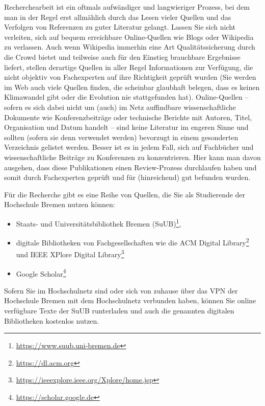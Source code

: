 \documentclass[11pt]{scrartcl}
\newcommand{\qto}[1]{\glqq #1\grqq}				%
\begin{document}
Recherchearbeit ist ein oftmals aufwändiger und langwieriger Prozess, bei dem man in der Regel erst allmählich durch das Lesen vieler Quellen und das Verfolgen von Referenzen zu \qto{guter} Literatur gelangt. Lassen Sie sich nicht verleiten, sich auf bequem erreichbare Online-Quellen wie Blogs oder Wikipedia zu verlassen. Auch wenn Wikipedia immerhin eine Art Qualitätssicherung durch die \qto{Crowd} bietet und teilweise auch für den Einstieg brauchbare Ergebnisse liefert, stellen derartige Quellen in aller Regel Informationen zur Verfügung, die nicht objektiv von Fachexperten auf ihre Richtigkeit geprüft wurden (Sie werden im Web auch viele Quellen finden, die scheinbar glaubhaft \qto{belegen}, dass es keinen Klimawandel gibt oder die Evolution nie stattgefunden hat).
%
Online-Quellen -- sofern es sich dabei nicht um (auch) im Netz auffindbare wissenschaftliche Dokumente wie Konferenzbeiträge oder technische Berichte mit Autoren, Titel, Organisation und Datum handelt -- sind keine Literatur im engeren Sinne und sollten (sofern sie denn verwendet werden) bevorzugt in einem gesonderten Verzeichnis gelistet werden. 
%
Besser ist es in jedem Fall, sich auf Fachbücher \cite{lit:GammaEtAl:DesignPatterns} und wissenschaftliche Beiträge \cite{lit:SyromiatnikovEtAl:Model-View-*DesignPatterns} zu Konferenzen zu konzentrieren. Hier kann man davon ausgehen, dass diese Publikationen einen Review-Prozess durchlaufen haben und somit durch Fachexperten geprüft und für (hinreichend) gut befunden wurden.

Für die Recherche gibt es eine Reihe von Quellen, die Sie als Studierende der Hochschule Bremen nutzen können:
\begin{itemize}
	\item Staats- und Universitätsbibliothek Bremen (SuUB)\footnote{\url{https://www.suub.uni-bremen.de}}, 
	\item digitale Bibliotheken von Fachgesellschaften wie die ACM Digital Library\footnote{\url{https://dl.acm.org}} und IEEE XPlore Digital Library\footnote{\url{https://ieeexplore.ieee.org/Xplore/home.jsp}}			\item Google Scholar\footnote{\url{https://scholar.google.de}}
\end{itemize}

\noindent
Sofern Sie im Hochschulnetz sind oder sich von zuhause über das VPN der Hochschule Bremen mit dem Hochschulnetz verbunden haben, können Sie online verfügbare Texte der SuUB runterladen und auch die genannten digitalen Bibliotheken kostenlos nutzen.
\end{document}
